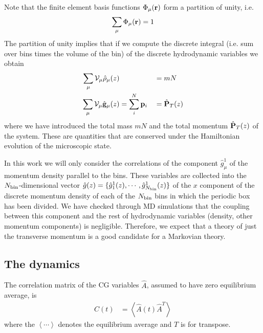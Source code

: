 \documentclass[a4paper,openright,12pt]{book}
\newcommand{\llangle}{\left\langle}
\newcommand{\rrangle}{\right\rangle}
\begin{document}
Note that the finite  element basis  functions $\Phi_\mu({\bf  r})$  form a
partition of unity, i.e.
\begin{align}
  \sum_\mu\Phi_\mu({\bf r})=1
\label{PartUnit}
\end{align}
The  partition  of unity  implies  that  if  we compute  the  discrete
integral  (i.e. sum  over bins  times the  volume of  the bin)  of the
discrete hydrodynamic variables we obtain
\begin{align}
  \sum_\mu{\cal V}_\mu\hat{\rho}_\mu(z)&  &&= mN
\nonumber\\
  \sum_\mu{\cal V}_\mu\hat{\bf g}_\mu(z)&=\sum_i^N{\bf p}_i&&= \hat{\bf P}_T(z)
\label{DiscCons}
\end{align}
where we  have introduced the total  mass $mN$ and the  total momentum
$\hat{\bf  P}_T(z)$ of  the  system.  These  are  quantities that  are
conserved under  the Hamiltonian  evolution of the  microscopic state.


In this work we  will only  consider the correlations  of the
component  $\hat{g}^1_\mu$ of  the  momentum density  parallel to  the
bins. These variables are collected into the $N_{\rm bin}$-dimensional
vector           $\hat{g}(z)=\{\hat{g}^1_1(z),\cdots,\hat{g}^1_{N_{\rm
    bin}}(z)\}$ of the $x$ component  of the discrete momentum density
of each of the ${N_{\rm bin}}$ bins in which the periodic box has been
divided.  We  have checked  through MD  simulations that  the coupling
between  this  component  and   the  rest  of  hydrodynamic  variables
(density,  other momentum  components) is  negligible.  Therefore,  we
expect  that a  theory  of  just the  transverse  momentum  is a  good
candidate for  a Markovian theory.  

\subsection{The dynamics}
\label{Sec:Trans}
The correlation matrix of the  CG variables $\hat{A}$, assumed to have zero
equilibrium average, is 
\begin{align}
  C(t)&=\llangle \hat{A}(t)\hat{A}^T\rrangle
\end{align}
where the $\llangle\cdots\rrangle$ denotes the equilibrium average and
$T$ is for transpose. 
\end{document}

